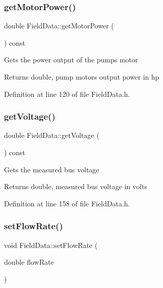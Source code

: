 \subsubsection{\texorpdfstring{get\+Motor\+Power()}{getMotorPower()}}
{\footnotesize\ttfamily double Field\+Data\+::get\+Motor\+Power (\begin{DoxyParamCaption}{ }\end{DoxyParamCaption}) const\hspace{0.3cm}{\ttfamily [inline]}}

Gets the power output of the pump\textquotesingle{}s motor

\begin{DoxyReturn}{Returns}
double, pump motor\textquotesingle{}s output power in hp 
\end{DoxyReturn}


Definition at line 120 of file Field\+Data.\+h.

\mbox{\label{class_field_data_a1e8a55965e6cbd8c7b49c0dd5fbee002}} 
\subsubsection{\texorpdfstring{get\+Voltage()}{getVoltage()}}
{\footnotesize\ttfamily double Field\+Data\+::get\+Voltage (\begin{DoxyParamCaption}{ }\end{DoxyParamCaption}) const\hspace{0.3cm}{\ttfamily [inline]}}

Gets the measured bus voltage

\begin{DoxyReturn}{Returns}
double, measured bus voltage in volts 
\end{DoxyReturn}


Definition at line 158 of file Field\+Data.\+h.

\mbox{\label{class_field_data_ad25c3e5a76b4e493e82d3f70cc3c0ed9}} 
\subsubsection{\texorpdfstring{set\+Flow\+Rate()}{setFlowRate()}}
{\footnotesize\ttfamily void Field\+Data\+::set\+Flow\+Rate (\begin{DoxyParamCaption}\item[{double}]{flow\+Rate }\end{DoxyParamCaption})\hspace{0.3cm}{\ttfamily [inline]}}

